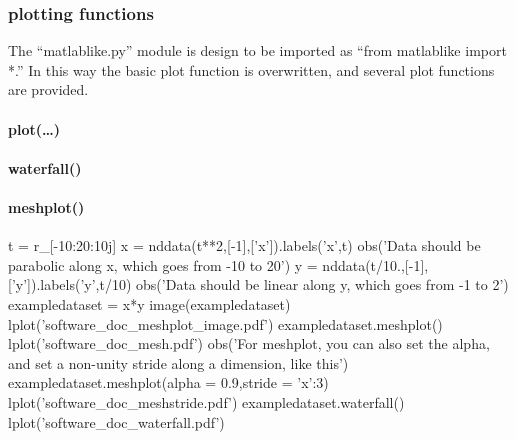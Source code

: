 
\subsubsection{plotting functions}
The ``matlablike.py'' module is design to be imported as ``from matlablike import *.''
In this way the basic plot function is overwritten, and several plot functions are provided.
\paragraph{plot(\ldots)}
\paragraph{waterfall()}

\paragraph{meshplot()}


\begin{python}
t = r_[-10:20:10j]
x = nddata(t**2,[-1],['x']).labels('x',t)
obs('Data should be parabolic along x, which goes from -10 to 20')
y = nddata(t/10.,[-1],['y']).labels('y',t/10)
obs('Data should be linear along y, which goes from -1 to 2')
exampledataset = x*y
image(exampledataset)
lplot('software_doc_meshplot_image.pdf')
exampledataset.meshplot()
lplot('software_doc_mesh.pdf')
obs('For meshplot, you can also set the alpha, and set a non-unity stride along a dimension, like this')
exampledataset.meshplot(alpha = 0.9,stride = {'x':3})
lplot('software_doc_meshstride.pdf')
exampledataset.waterfall()
lplot('software_doc_waterfall.pdf')
\end{python}
